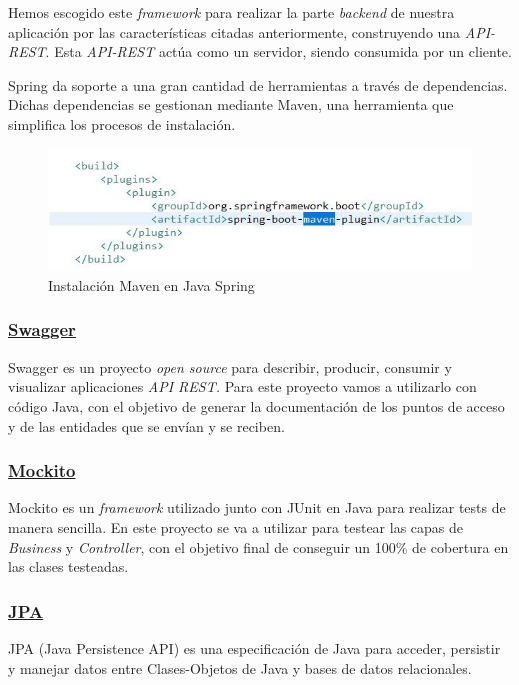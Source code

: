     Hemos escogido este \textit{framework} para realizar la parte \textit{backend} de nuestra aplicación por las características citadas anteriormente, construyendo una \textit{API-REST}. Esta \textit{API-REST} actúa como un servidor, siendo consumida por un cliente.
     \newline
    
    Spring da soporte a una gran cantidad de herramientas a través de dependencias. Dichas dependencias se gestionan mediante Maven\cite{maven}, una herramienta que simplifica los procesos de instalación.
    
    \begin{figure}[h]
    \centering
    \includegraphics[width=1\textwidth]{images/maven}
    \caption{Instalación Maven en Java Spring}
    \end{figure}
    
    

        \subsubsection{\underline{Swagger}}
        Swagger\cite{swagger} es un proyecto \textit{open source} para describir, producir, consumir y visualizar aplicaciones \textit{API REST.} Para este proyecto vamos a utilizarlo con código Java, con el objetivo de generar la documentación de los puntos de acceso y de las entidades que se envían y se reciben.

        
        \subsubsection{\underline{Mockito}}
        Mockito\cite{mockito} es un \textit{framework} utilizado junto con JUnit\cite{junit} en Java para realizar tests de manera sencilla. En este proyecto se va a utilizar para testear las capas de \emph{Business} y \emph{Controller}, con el objetivo final de conseguir un 100\% de cobertura en las clases testeadas.
        \newline
        

        \subsubsection{\underline{JPA}}
        JPA\cite{jpa} (Java Persistence API) es una especificación de Java para acceder, persistir y manejar datos entre Clases-Objetos de Java y bases de datos relacionales.
        \newline
        
